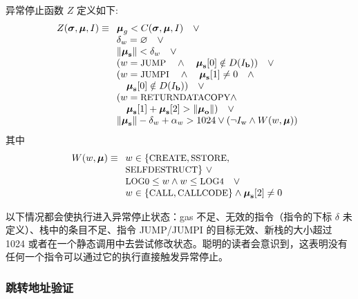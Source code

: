 \documentclass[9pt,oneside]{amsart}
\begin{document}
\begin{multicols}{2}
异常停止函数 $Z$ 定义如下:
\begin{equation} 
Z(\boldsymbol{\sigma}, \boldsymbol{\mu}, I) \equiv
\begin{array}[t]{l}
\boldsymbol{\mu}_g < C(\boldsymbol{\sigma}, \boldsymbol{\mu}, I) \quad \vee \\
\mathbf{\delta}_w = \varnothing \quad \vee \\
\lVert\boldsymbol{\mu}_\mathbf{s}\rVert < \mathbf{\delta}_w \quad \vee \\
( w = \text{\small JUMP} \quad \wedge \quad \boldsymbol{\mu}_\mathbf{s}[0] \notin D(I_\mathbf{b}) ) \quad \vee \\
( w = \text{\small JUMPI} \quad \wedge \quad \boldsymbol{\mu}_\mathbf{s}[1] \neq 0 \quad \wedge \\
\quad \boldsymbol{\mu}_\mathbf{s}[0] \notin D(I_\mathbf{b}) ) \quad \vee \\
( w = \text{\small RETURNDATACOPY} \wedge \\ \quad \boldsymbol{\mu}_{\mathbf{s}}[1] + \boldsymbol{\mu}_{\mathbf{s}}[2] > \lVert\boldsymbol{\mu}_{\mathbf{o}}\rVert) \quad \vee \\
\lVert\boldsymbol{\mu}_\mathbf{s}\rVert - \mathbf{\delta}_w + \mathbf{\alpha}_w > 1024 \vee
 (\neg I_{\mathrm{w}} \wedge W(w, \boldsymbol{\mu}))
\end{array}
\end{equation}
其中
\begin{equation}
W(w, \boldsymbol{\mu}) \equiv \\ 
\begin{array}[t]{l}
w \in \{\text{\small CREATE}, \text{\small SSTORE},\\ \text{\small SELFDESTRUCT}\} \ \vee \\
\text{\small LOG0} \le w \wedge w \le \text{\small LOG4} \quad \vee \\
w \in \{\text{\small CALL}, \text{\small CALLCODE}\} \wedge \boldsymbol{\mu}_{\mathbf{s}}[2] \neq 0
\end{array}
\end{equation}

以下情况都会使执行进入异常停止状态：gas 不足、无效的指令（指令的下标 $\delta$ 未定义）、栈中的条目不足、指令 {\small JUMP}/{\small JUMPI} 的目标无效、新栈的大小超过 1024 或者在一个静态调用中去尝试修改状态。聪明的读者会意识到，这表明没有任何一个指令可以通过它的执行直接触发异常停止。

\subsubsection{跳转地址验证}


\end{multicols}
\end{document}
